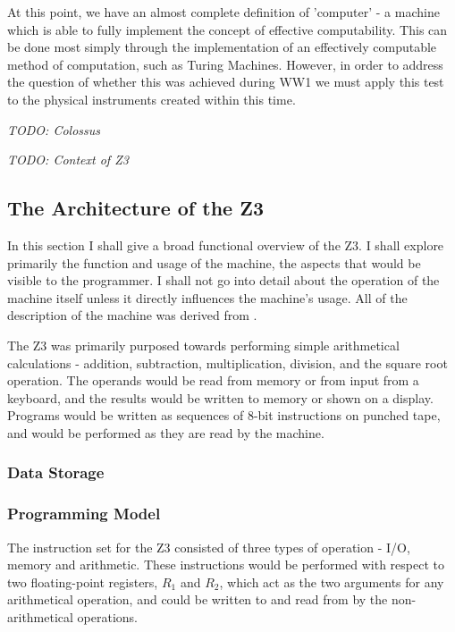 \documentclass[Master.tex]{subfiles}
\begin{document}
At this point, we have an almost complete definition of 'computer' - a machine which is able to fully implement the concept of effective computability. This can be done most simply through the implementation of an effectively computable method of computation, such as Turing Machines. However, in order to address the question of whether this was achieved during WW1 we must apply this test to the physical instruments created within this time.

\textit{TODO: Colossus}

\textit{TODO: Context of Z3}

\subsection{The Architecture of the Z3}

In this section I shall give a broad functional overview of the Z3. I shall explore primarily the function and usage of the machine, the aspects that would be visible to the programmer. I shall not go into detail about the operation of the machine itself unless it directly influences the machine's usage. All of the description of the machine was derived from \cite{rojas1997z3architecture}.

The Z3 was primarily purposed towards performing simple arithmetical calculations - addition, subtraction, multiplication, division, and the square root operation. The operands would be read from memory or from input from a keyboard, and the results would be written to memory or shown on a display. Programs would be written as sequences of 8-bit instructions on punched tape, and would be performed as they are read by the machine.

\subsubsection{Data Storage}



\subsubsection{Programming Model}

The instruction set for the Z3 consisted of three types of operation - I/O, memory and arithmetic. These instructions would be performed with respect to two floating-point registers, $R_1$ and $R_2$, which act as the two arguments for any arithmetical operation, and could be written to and read from by the non-arithmetical operations. 
\end{document}
